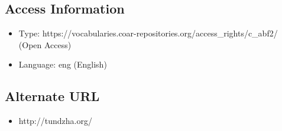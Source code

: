 \begin{framed}
{\subsection*{Access Information}
\begin{itemize}
\item Type: https://vocabularies.coar-repositories.org/access\_rights/c\_abf2/ (Open Access)
\item Language: eng (English)
\end{itemize}

\subsection*{Alternate URL}
\begin{itemize}
\item http://tundzha.org/
\end{itemize}

}

\end{framed}